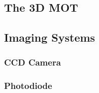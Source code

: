 \subsection{The 3D MOT}\label{subsec:setup_3DMOT}
\subsection{Imaging Systems}\label{subsec:setup_imaging}
\subsubsection{CCD Camera}\label{subsubsec:setup_ccd}
\subsubsection{Photodiode}\label{subsubsec:setup_photodiode}

